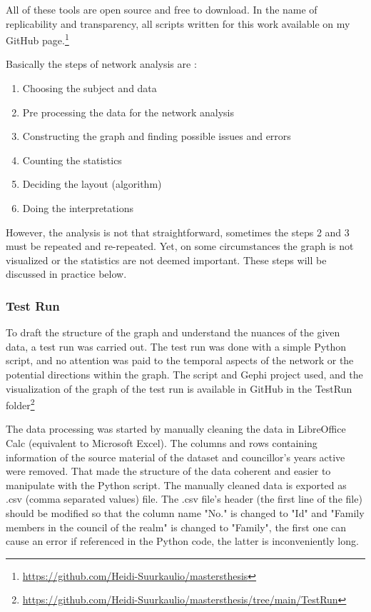 All of these tools are open source and free to download. In the name of replicability and transparency, all scripts written for this work available on my GitHub page.\footnote{\url{https://github.com/Heidi-Suurkaulio/mastersthesis}}

Basically the steps of network analysis are : \begin{enumerate}
	\item Choosing the subject and data
	\item Pre processing the data for the network analysis
	\item Constructing the graph and finding possible issues and errors 
	\item Counting the statistics
	\item Deciding the layout (algorithm)
	\item Doing the interpretations
\end{enumerate}
However, the analysis is not that straightforward, sometimes the steps 2 and 3 must be repeated and re-repeated. Yet, on some circumstances the graph is not visualized or the statistics are not deemed important. These steps will be discussed in practice below.

\subsubsection{Test Run}

To draft the structure of the graph and understand the nuances of the given data, a test run was carried out. The test run was done with a simple Python script, and no attention was paid to the temporal aspects of the network or the potential directions within the graph. The script and Gephi project used, and the visualization of the graph of the test run is available in GitHub in the TestRun folder\footnote{\url{https://github.com/Heidi-Suurkaulio/mastersthesis/tree/main/TestRun}}

The data processing was started by manually cleaning the data in LibreOffice Calc (equivalent to Microsoft Excel). The columns and rows containing information of the source material of the dataset and councillor's years active were removed. That made the structure of the data coherent and easier to manipulate with the Python script. The manually cleaned data is exported as .csv (comma separated values) file. The .csv file's header (the first line of the file) should be modified so that the column name "No." is changed to "Id" and "Family members in the council of the realm" is changed to "Family", the first one can cause an error if referenced in the Python code, the latter is inconveniently long.

